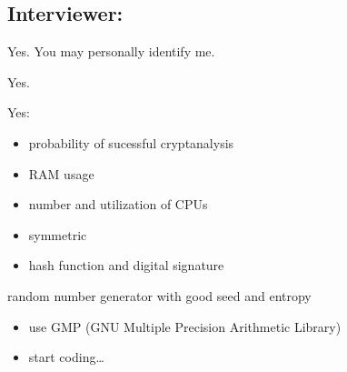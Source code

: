 \subsection{Interviewer: \vp}


\begin{answer}{1}
Yes.
You may personally identify me.
\end{answer}


\begin{answer}{2}
Yes.
\end{answer}


\begin{answer}{3}
Yes:
\begin{itemize}
\item probability of sucessful cryptanalysis
\item RAM usage
\item number and utilization of CPUs
\end{itemize}
\end{answer}


\begin{answer}{4}
\begin{itemize}
\item symmetric \aes
\item hash function and digital signature
\end{itemize}
\end{answer}


\begin{answer}{5}
random number generator with good seed and entropy
\end{answer}


\begin{answer}{6}
\begin{itemize}
\item use GMP (GNU Multiple Precision Arithmetic Library)
\item start coding\ldots
\end{itemize}
\end{answer}

